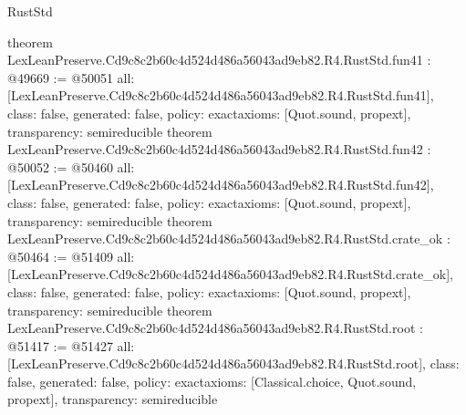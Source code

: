 \begin{lexlean}{RustStd}
\begin{coremodule}
{}
theorem LexLeanPreserve.Cd9c8c2b60c4d524d486a56043ad9eb82.R4.RustStd.fun41 : @49669 := @50051 {
  all: [LexLeanPreserve.Cd9c8c2b60c4d524d486a56043ad9eb82.R4.RustStd.fun41],
  class: false,
  generated: false,
  policy: exact{axioms: [Quot.sound, propext]},
  transparency: semireducible
}
theorem LexLeanPreserve.Cd9c8c2b60c4d524d486a56043ad9eb82.R4.RustStd.fun42 : @50052 := @50460 {
  all: [LexLeanPreserve.Cd9c8c2b60c4d524d486a56043ad9eb82.R4.RustStd.fun42],
  class: false,
  generated: false,
  policy: exact{axioms: [Quot.sound, propext]},
  transparency: semireducible
}
theorem LexLeanPreserve.Cd9c8c2b60c4d524d486a56043ad9eb82.R4.RustStd.crate_ok : @50464 := @51409 {
  all: [LexLeanPreserve.Cd9c8c2b60c4d524d486a56043ad9eb82.R4.RustStd.crate_ok],
  class: false,
  generated: false,
  policy: exact{axioms: [Quot.sound, propext]},
  transparency: semireducible
}
theorem LexLeanPreserve.Cd9c8c2b60c4d524d486a56043ad9eb82.R4.RustStd.root : @51417 := @51427 {
  all: [LexLeanPreserve.Cd9c8c2b60c4d524d486a56043ad9eb82.R4.RustStd.root],
  class: false,
  generated: false,
  policy: exact{axioms: [Classical.choice, Quot.sound, propext]},
  transparency: semireducible
}


\end{coremodule}
\end{lexlean}

